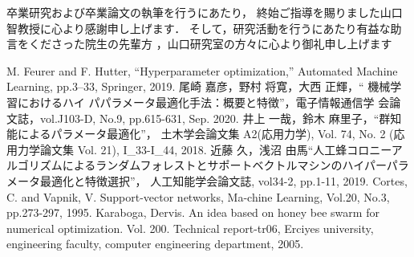 \documentclass[12pt, dvipdfmx]{jarticle}
\numberwithin{equation}{section}
\begin{document}

\tableofcontents %
\clearpage %

\clearpage %
\clearpage
\clearpage
\clearpage
\clearpage
\clearpage

\clearpage
\clearpage

卒業研究および卒業論文の執筆を行うにあたり，
終始ご指導を賜りました山口智教授に心より感謝申し上げます．
そして，研究活動を行うにあたり有益な助言をくださった院生の先輩方
，山口研究室の方々に心より御礼申し上げます%
\clearpage

\begin{thebibliography}{99} %
M. Feurer and F. Hutter, “Hyperparameter optimization,” Automated Machine Learning, pp.3–33, Springer, 2019.
尾崎 嘉彦，野村 将寛，大西 正輝，“ 機械学習におけるハイ
パパラメータ最適化手法：概要と特徴”，電子情報通信学
会論文誌，vol.J103-D, No.9, pp.615-631, Sep. 2020.
井上 一哉，鈴木 麻里子，“群知能によるパラメータ最適化”，
土木学会論文集 A2(応用力学), Vol. 74, No. 2 (応用力学論文集 Vol. 21), I\_33-I\_44, 2018.
近藤 久，浅沼 由馬“人工蜂コロニーアルゴリズムによるランダムフォレストとサポートベクトルマシンのハイパーパラメータ最適化と特徴選択”，
人工知能学会論文誌, vol34-2, pp.1-11, 2019.
Cortes, C. and Vapnik, V. Support-vector networks, Ma-chine Learning, Vol.20, No.3, pp.273-297, 1995.
Karaboga, Dervis. An idea based on honey bee swarm for numerical optimization. Vol. 200. 
Technical report-tr06, Erciyes university, engineering faculty, computer engineering department, 2005.
\end{thebibliography} %
\end{document}
